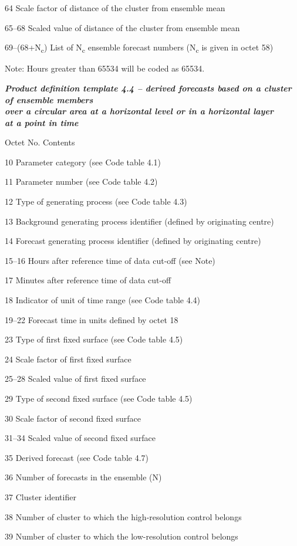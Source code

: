 64 Scale factor of distance of the cluster from ensemble mean

65--68 Scaled value of distance of the cluster from ensemble mean

69--(68+N\textsubscript{c}) List of N\textsubscript{c} ensemble forecast numbers (N\textsubscript{c} is given in octet 58)

Note: Hours greater than 65534 will be coded as 65534.

\emph{\textbf{Product definition template 4.4 -- derived forecasts based on a cluster of ensemble members\\
over a circular area at a horizontal level or in a horizontal layer\\
at a point in time}}

Octet No. Contents

10 Parameter category (see Code table 4.1)

11 Parameter number (see Code table 4.2)

12 Type of generating process (see Code table 4.3)

13 Background generating process identifier (defined by originating centre)

14 Forecast generating process identifier (defined by originating centre)

15--16 Hours after reference time of data cut-off (see Note)

17 Minutes after reference time of data cut-off

18 Indicator of unit of time range (see Code table 4.4)

19--22 Forecast time in units defined by octet 18

23 Type of first fixed surface (see Code table 4.5)

24 Scale factor of first fixed surface

25--28 Scaled value of first fixed surface

29 Type of second fixed surface (see Code table 4.5)

30 Scale factor of second fixed surface

31--34 Scaled value of second fixed surface

35 Derived forecast (see Code table 4.7)

36 Number of forecasts in the ensemble (N)

37 Cluster identifier

38 Number of cluster to which the high-resolution control belongs

39 Number of cluster to which the low-resolution control belongs


